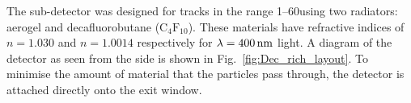 \subsubsection{\richone}
The \richone sub-detector was designed for tracks in the range 1--60\gevc using two radiators: aerogel and decafluorobutane ($\text{C}_{4}\text{F}_{10}$). These materials have refractive indices of $n = 1.030$ and $n = 1.0014$ respectively for $\lambda = 400\mathrm{ \,nm}$ light. A diagram of the \richone detector as seen from the side is shown in Fig.~\ref{fig:Dec_rich_layout}. To minimise the amount of material that the particles pass through, the \richone detector is attached directly onto the \velo exit window.  

